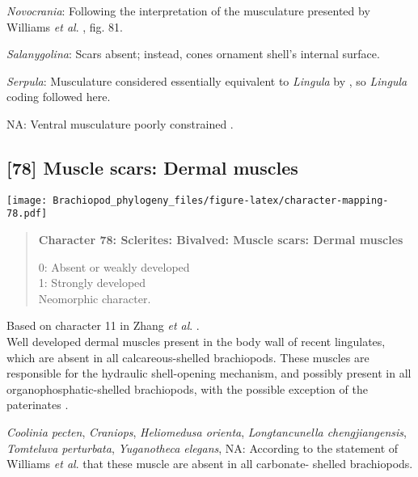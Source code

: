 \documentclass[openany]{book}
\theoremstyle{definition}
\theoremstyle{definition}
\theoremstyle{definition}
\theoremstyle{remark}
\begin{document}
\hypertarget{Novocrania-coding-77}{}
\emph{Novocrania}: Following the interpretation of the musculature
presented by Williams \emph{et al}.
\citeyearpar{Williams2000LinguliformeaCraniiformea}, fig. 81.

\hypertarget{Salanygolina-coding-77}{}
\emph{Salanygolina}: Scars absent; instead, cones ornament shell's
internal surface.

\hypertarget{Serpula-coding-77}{}
\emph{Serpula}: Musculature considered essentially equivalent to
\emph{Lingula} by \citet{Williams2000LinguliformeaCraniiformea}, so
\emph{Lingula} coding followed here.

\hypertarget{NA-coding-77}{}
NA: Ventral musculature poorly constrained
\citep{Williams2000LinguliformeaCraniiformea, Popov2009Earlyontogeny}.

\subsection*{{[}78{]} Muscle scars: Dermal
muscles}\label{muscle-scars-dermal-muscles}

\texttt{[image: Brachiopod\_phylogeny\_files/figure-latex/character-mapping-78.pdf]}

\begin{quote}
\textbf{Character 78: Sclerites: Bivalved: Muscle scars: Dermal muscles}

0: Absent or weakly developed\\
1: Strongly developed\\
Neomorphic character.
\end{quote}

Based on character 11 in Zhang \emph{et al}.
\citeyearpar{Zhang2014Anearly}.\\
Well developed dermal muscles present in the body wall of recent
lingulates, which are absent in all calcareous-shelled brachiopods.
These muscles are responsible for the hydraulic shell-opening mechanism,
and possibly present in all organophosphatic-shelled brachiopods, with
the possible exception of the paterinates
\citep[p.~32]{Williams2000LinguliformeaCraniiformea}.

\hypertarget{Coolinia_pecten-coding-78}{}
\emph{Coolinia pecten}, \emph{Craniops}, \emph{Heliomedusa orienta},
\emph{Longtancunella chengjiangensis}, \emph{Tomteluva perturbata},
\emph{Yuganotheca elegans}, NA: According to the statement of Williams
\emph{et al}. \citeyearpar[p.~32]{Williams2000LinguliformeaCraniiformea}
that these muscle are absent in all carbonate- shelled brachiopods.
\end{document}
